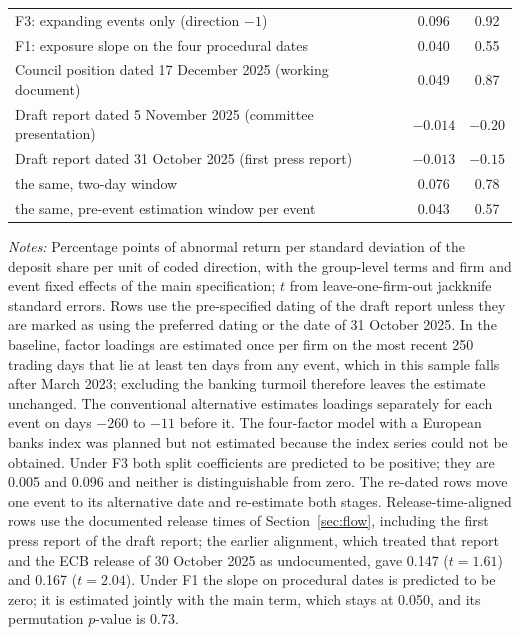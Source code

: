 \documentclass[11pt]{article}
\theoremstyle{plain}\newtheorem{proposition}{Proposition}
\begin{document}
\begin{table}[ht]
\begin{threeparttable}
\begin{tabular}{lcc}
F3: expanding events only (direction $-1$) & 0.096 & 0.92 \\
F1: exposure slope on the four procedural dates & 0.040 & 0.55 \\
Council position dated 17 December 2025 (working document) & 0.049 & 0.87 \\
Draft report dated 5 November 2025 (committee presentation) & $-0.014$ & $-0.20$ \\
Draft report dated 31 October 2025 (first press report) & $-0.013$ & $-0.15$ \\
\quad the same, two-day window & 0.076 & 0.78 \\
\quad the same, pre-event estimation window per event & 0.043 & 0.57 \\
\bottomrule
\end{tabular}
\begin{tablenotes}\footnotesize
\item \textit{Notes:} Percentage points of abnormal return per standard deviation of the deposit share per unit of coded direction, with the group-level terms and firm and event fixed effects of the main specification; $t$ from leave-one-firm-out jackknife standard errors. Rows use the pre-specified dating of the draft report unless they are marked as using the preferred dating or the date of 31 October 2025. In the baseline, factor loadings are estimated once per firm on the most recent 250 trading days that lie at least ten days from any event, which in this sample falls after March 2023; excluding the banking turmoil therefore leaves the estimate unchanged. The conventional alternative estimates loadings separately for each event on days $-260$ to $-11$ before it. The four-factor model with a European banks index was planned but not estimated because the index series could not be obtained. Under F3 both split coefficients are predicted to be positive; they are 0.005 and 0.096 and neither is distinguishable from zero. The re-dated rows move one event to its alternative date and re-estimate both stages. Release-time-aligned rows use the documented release times of Section~\ref{sec:flow}, including the first press report of the draft report; the earlier alignment, which treated that report and the ECB release of 30 October 2025 as undocumented, gave 0.147 ($t = 1.61$) and 0.167 ($t = 2.04$). Under F1 the slope on procedural dates is predicted to be zero; it is estimated jointly with the main term, which stays at 0.050, and its permutation $p$-value is 0.73.
\end{tablenotes}
\end{threeparttable}
\end{table}
\end{document}
